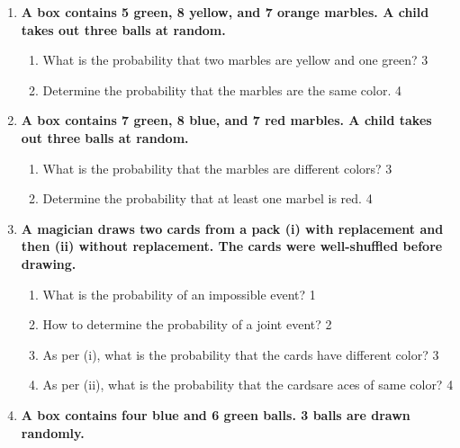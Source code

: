 \documentclass[a4paper,oneside]{book}
\begin{document}
\begin{enumerate}
  \begin{enumerate}
    \item  
	What is the probability that at least two balls are black? \hfill 3
    \item
	Whose expectation is more probable? Analyze.  \hfill 4
  \end{enumerate}
  
   \item
	  \textbf{A box contains 5 green, 8 yellow, and 7 orange marbles. A child takes out three balls at random.} 
  
  \begin{enumerate}
    \item  
	What is the probability that two marbles are yellow and one green? \hfill 3
    \item
	Determine the probability that the marbles are the same color. \hfill 4
  \end{enumerate}
  
     \item
	  \textbf{A box contains 7 green, 8 blue, and 7 red marbles. A child takes out three balls at random.} 
  
  \begin{enumerate}
    \item  
	What is the probability that the marbles are different colors? \hfill 3
    \item
	Determine the probability that at least one marbel is red. \hfill 4
  \end{enumerate}

 \item
	  \textbf{A magician draws two cards from a pack (i) with replacement and then (ii) without replacement. The cards were well-shuffled before drawing.} 
  
  \begin{enumerate}
    \item
	What is the probability of an impossible event? \hfill 1
    \item
	How to determine the probability of a joint event?  \hfill 2
    \item  
	As per (i), what is the probability that the cards have different color? \hfill 3
    \item
	As per (ii), what is the probability that the cardsare aces of same color?  \hfill 4
  \end{enumerate}

 \item
	  \textbf{A box contains four blue and 6 green balls. 3 balls are drawn randomly.} 
  

\end{enumerate}
\end{document}
